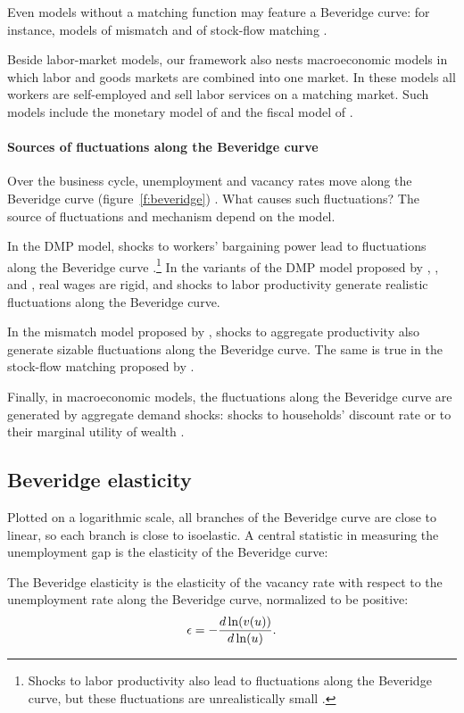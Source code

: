 \documentclass[letterpaper,12pt,leqno]{article}
\begin{document}
Even models without a matching function may feature a Beveridge curve: for instance, models of mismatch  and of stock-flow matching .

Beside labor-market models, our framework also nests macroeconomic models in which labor and goods markets are combined into one market. In these models all workers are self-employed and sell labor services on a matching market. Such models include the monetary model of  and the fiscal model of .

\paragraph{Sources of fluctuations along the Beveridge curve} Over the business cycle, unemployment and vacancy rates move along the Beveridge curve (figure~\ref{f:beveridge}) . What causes such fluctuations? The source of fluctuations and mechanism depend on the model.

In the DMP model, shocks to workers' bargaining power lead to fluctuations along the Beveridge curve .\footnote{Shocks to labor productivity also lead to fluctuations along the Beveridge curve, but these fluctuations are unrealistically small .} In the variants of the DMP model proposed by , , and , real wages are rigid, and shocks to labor productivity generate realistic fluctuations along the Beveridge curve. 

In the mismatch model proposed by , shocks to aggregate productivity also generate sizable fluctuations along the Beveridge curve. The same is true in the stock-flow matching proposed by . 

Finally, in macroeconomic models, the fluctuations along the Beveridge curve are generated by aggregate demand shocks: shocks to households' discount rate or to their marginal utility of wealth .

\subsection{Beveridge elasticity} 

Plotted on a logarithmic scale, all branches of the Beveridge curve are close to linear, so each branch is close to isoelastic. A central statistic in measuring the unemployment gap is the elasticity of the Beveridge curve:

\begin{definition} The Beveridge elasticity is the elasticity of the vacancy rate with respect to the unemployment rate along the Beveridge curve, normalized to be positive: 
\begin{equation*}
\e = -\odl{v(u)}{u}.
\end{equation*}\end{definition}
\end{document}
